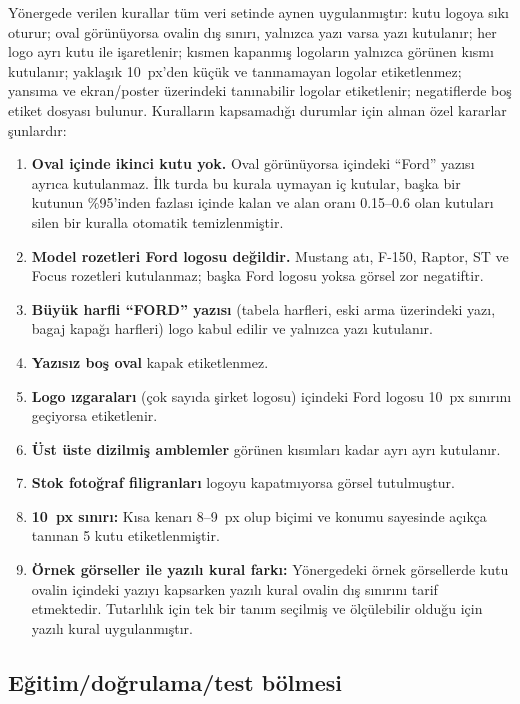 \documentclass[conference]{IEEEtran}
\begin{document}
Yönergede verilen kurallar tüm veri setinde aynen uygulanmıştır: kutu logoya sıkı oturur;
oval görünüyorsa ovalin dış sınırı, yalnızca yazı varsa yazı kutulanır; her logo ayrı kutu ile
işaretlenir; kısmen kapanmış logoların yalnızca görünen kısmı kutulanır; yaklaşık 10~px'den
küçük ve tanınamayan logolar etiketlenmez; yansıma ve ekran/poster üzerindeki tanınabilir
logolar etiketlenir; negatiflerde boş etiket dosyası bulunur. Kuralların kapsamadığı durumlar
için alınan özel kararlar şunlardır:

\begin{enumerate}
\item \textbf{Oval içinde ikinci kutu yok.} Oval görünüyorsa içindeki ``Ford'' yazısı ayrıca
kutulanmaz. İlk turda bu kurala uymayan iç kutular, başka bir kutunun \%95'inden fazlası içinde
kalan ve alan oranı 0.15--0.6 olan kutuları silen bir kuralla otomatik temizlenmiştir.
\item \textbf{Model rozetleri Ford logosu değildir.} Mustang atı, F-150, Raptor, ST ve Focus
rozetleri kutulanmaz; başka Ford logosu yoksa görsel zor negatiftir.
\item \textbf{Büyük harfli ``FORD'' yazısı} (tabela harfleri, eski arma üzerindeki yazı,
bagaj kapağı harfleri) logo kabul edilir ve yalnızca yazı kutulanır.
\item \textbf{Yazısız boş oval} kapak etiketlenmez.
\item \textbf{Logo ızgaraları} (çok sayıda şirket logosu) içindeki Ford logosu 10~px sınırını
geçiyorsa etiketlenir.
\item \textbf{Üst üste dizilmiş amblemler} görünen kısımları kadar ayrı ayrı kutulanır.
\item \textbf{Stok fotoğraf filigranları} logoyu kapatmıyorsa görsel tutulmuştur.
\item \textbf{10~px sınırı:} Kısa kenarı 8--9~px olup biçimi ve konumu sayesinde açıkça
tanınan 5 kutu etiketlenmiştir.
\item \textbf{Örnek görseller ile yazılı kural farkı:} Yönergedeki örnek görsellerde kutu
ovalin içindeki yazıyı kapsarken yazılı kural ovalin dış sınırını tarif etmektedir.
Tutarlılık için tek bir tanım seçilmiş ve ölçülebilir olduğu için yazılı kural uygulanmıştır.
\end{enumerate}

\subsection{Eğitim/doğrulama/test bölmesi}
\end{document}
